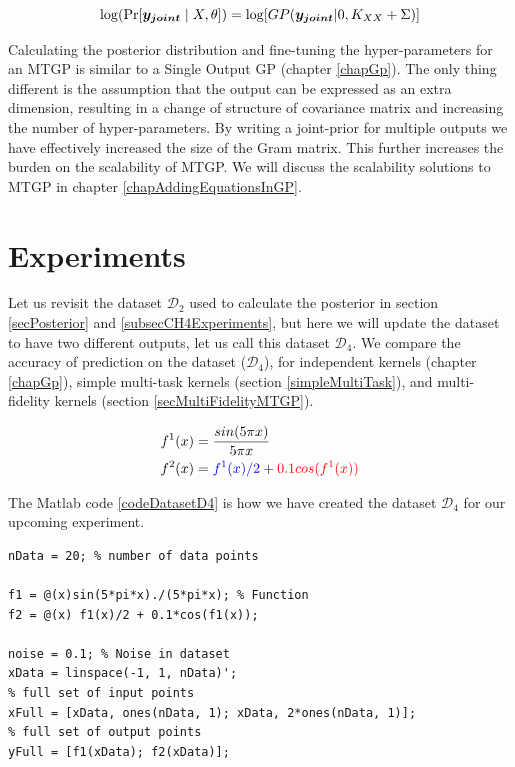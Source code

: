   \begin{equation}\label{eq:exactMONLML}
\log(\Pr[\boldsymbol{y_{joint}} \mid X, \theta]) = \log[GP(\boldsymbol{y_{joint}}| 0, K_{XX} + \Sigma )]
  \end{equation}
  
Calculating the posterior distribution and fine-tuning the hyper-parameters for an MTGP is similar to a Single Output GP (chapter \ref{chapGp}). The only thing different is the assumption that the output can be expressed as an extra dimension, resulting in a change of structure of covariance matrix and increasing the number of hyper-parameters. By writing a joint-prior for multiple outputs we have effectively increased the size of the Gram matrix. This further increases the burden on the scalability of MTGP. We will discuss the scalability solutions to MTGP in chapter \ref{chapAddingEquationsInGP}. 

\section{Experiments}\label{subsecCh6Experiments}
\begin{mdframed}[hidealllines=true,backgroundcolor=lightgray!20]
Let us revisit the dataset $\mathcal{D}_{2}$ used to calculate the posterior in section \ref{secPosterior} and \ref{subsecCH4Experiments}, but here we will update the dataset to have two different outputs, let us call this dataset $\mathcal{D}_{4}$. We compare the accuracy of prediction on the dataset ($\mathcal{D}_{4}$), for independent kernels (chapter \ref{chapGp}), simple multi-task kernels (section \ref{simpleMultiTask}), and multi-fidelity kernels (section \ref{secMultiFidelityMTGP}). 

\begin{align}\label{eqFunctionForD4}
f^{1}(x) & = \frac{sin(5 \pi x)}{5 \pi x} \\
f^{2}(x) & = \textcolor{blue}{f^{1}(x)/2} +\textcolor{red}{0.1cos(f^{1}(x))}
\end{align}

\end{mdframed}

The Matlab code \ref{codeDatasetD4} is how we have created the dataset $\mathcal{D}_{4}$ for our upcoming experiment. 

\begin{mdframed}[hidealllines=true,backgroundcolor=lightgray!20]
\begin{lstlisting}[caption={Code for dataset D4}, 
                    captionpos=b,
                    label={codeDatasetD4},
                    style=Matlab-editor, 
                    basicstyle=\color{black}\ttfamily\small,
                    backgroundcolor = \color{MatlabCellColour}]
nData = 20; % number of data points

f1 = @(x)sin(5*pi*x)./(5*pi*x); % Function
f2 = @(x) f1(x)/2 + 0.1*cos(f1(x));

noise = 0.1; % Noise in dataset
xData = linspace(-1, 1, nData)';
% full set of input points
xFull = [xData, ones(nData, 1); xData, 2*ones(nData, 1)]; 
% full set of output points
yFull = [f1(xData); f2(xData)];
\end{lstlisting}
\end{mdframed}

